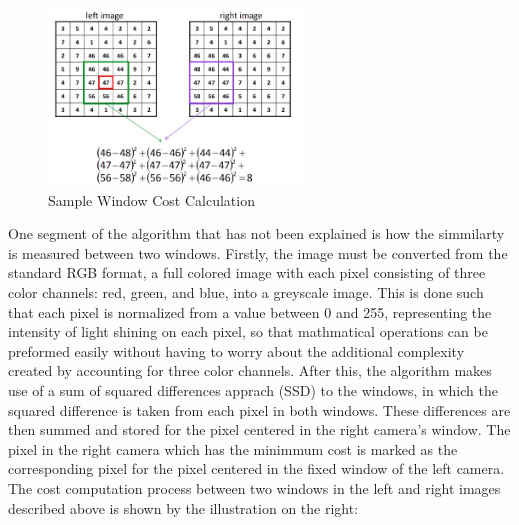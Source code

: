 \documentclass[11pt]{scrartcl}
\begin{document}
\begin{figure}
  \includegraphics[width=0.6\textwidth]{ex.jpg}
  \caption{\label{fig:frog1} Sample Window Cost Calculation}
\end{figure}

One segment of the algorithm that has not been explained is how the simmilarty is 
measured between two windows. Firstly, the image must be converted from the standard RGB format, 
a full colored image with each pixel consisting of three color channels: red, green, and blue,  
into a greyscale image. This is done such that each pixel is normalized from a value between 
0 and 255, representing the intensity of light shining on each pixel, so that mathmatical 
operations can be preformed easily without having to worry about the additional complexity 
created by accounting for three color channels. After this, the algorithm makes use of a sum of squared differences apprach
(SSD) to the windows, in which the squared difference is taken from each pixel in both windows. 
These differences are then summed and stored for the pixel centered in the right camera's window. The 
pixel in the right camera which has the minimmum cost is marked as the corresponding pixel 
for the pixel centered in the fixed window of the left camera. The cost computation process 
between two windows in the left and right images described above is shown by the
illustration on the right: 
\newpage
\end{document}
